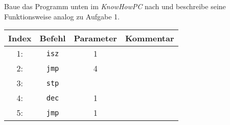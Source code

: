 \documentclass[10pt, a4paper]{scrartcl}
\begin{document}
\begin{aufgabe}[symbol=\symLaptop]
	Baue das Programm unten im \emph{KnowHowPC} nach und beschreibe seine Funktionsweise analog zu Aufgabe 1.
	
	\begin{center}
	\begin{tabularx}{.8\textwidth}{|c|c|c|X|}\hline
		\rowcolor{black!10}
		Index & Befehl & Parameter & Kommentar \\\hline
		1: & \texttt{isz} & 1 & \Zeilenabstand\\\hline
		2: & \texttt{jmp} & 4 & \Zeilenabstand\\\hline
		3: & \texttt{stp} &   & \Zeilenabstand\\\hline
		4: & \texttt{dec} & 1 & \Zeilenabstand\\\hline
		5: & \texttt{jmp} & 1 & \Zeilenabstand\\\hline
	\end{tabularx}
	\end{center}
\end{aufgabe}
\end{document}
